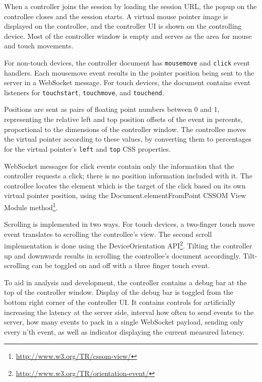 \documentclass[a4paper,english,twocolumn,9pt]{extarticle}
\begin{document}
When a controller joins the session by loading the session URL, the
popup on the controllee closes and the session starts. A virtual mouse
pointer image is displayed on the controllee, and the controller UI is
shown on the controlling device. Most of the controller window is
empty and serves as the area for mouse and touch movements.

For non-touch devices, the controller document has \verb!mousemove!
and \verb!click!  event handlers. Each mousemove event results in the
pointer position being sent to the server in a WebSocket message. For
touch devices, the document contains event listeners
for \verb!touchstart!, \verb!touchmove!, and
\verb!touchend!.

Positions are sent as pairs of floating point numbers between 0 and 1,
representing the relative left and top position offsets of the event
in percents, proportional to the dimensions of the controller
window. The controllee moves the virtual pointer according to these
values, by converting them to percentages for the virtual pointer's
\verb!left! and \verb!top! CSS properties.

WebSocket messages for click events contain only the information that
the controller requests a click; there is no position information
included with it. The controllee locates the element which is the
target of the click based on its own virtual pointer position, using
the Document.elementFromPoint CSSOM View Module
method\footnote{\url{http://www.w3.org/TR/cssom-view/}}.

Scrolling is implemented in two ways. For touch devices, a two-finger
touch move event translates to scrolling the controllee's view. The
second scroll implementation is done using the DeviceOrientation
API\footnote{\url{http://www.w3.org/TR/orientation-event/}}. Tilting
the controller up and downwards results in scrolling the controllee's
document accordingly. Tilt-scrolling can be toggled on and off with a
three finger touch event.

To aid in analysis and development, the controller contains a debug
bar at the top of the controller window. Display of the debug bar is
toggled from the bottom right corner of the controller UI. It contains
controls for artificially increasing the latency at the server side,
interval how often to send events to the server, how many events to
pack in a single WebSocket payload, sending only every n'th event, as
well as indicator displaying the current measured latency.
\end{document}
